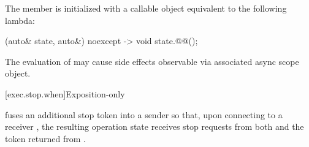 \pnum
The member 
is initialized with a callable object equivalent to the following lambda:
\begin{codeblock}
[](auto& state, auto&) noexcept -> void {
  state.@@();
}
\end{codeblock}

\pnum
The evaluation of 
may cause side effects observable
via  associated async scope object.

[exec.stop.when]{Exposition-only }

\pnum
 fuses an additional stop token 
into a sender so that, upon connecting to a receiver ,
the resulting operation state receives stop requests from both
 and the token returned from .


